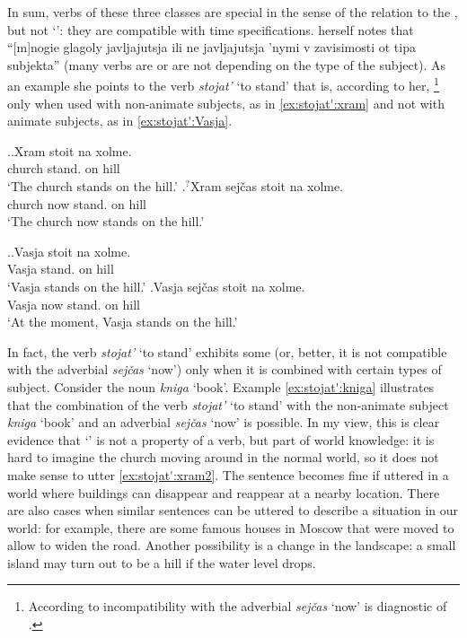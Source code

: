 In sum, verbs of these three classes are special in the sense of the relation to the , but not `': they are compatible with time specifications. \citet[132]{Paducheva:96} herself notes that ``[m]nogie glagoly javljajutsja ili ne javljajutsja 'nymi v zavisimosti ot tipa subjekta'' (many verbs are or are not  depending on the type of the subject). As an example she points to the verb \textit{stojat'} `to stand' that is, according to her, \footnote{According to \citet{Paducheva:96} incompatibility with the adverbial \textit{sej\v{c}as} `now' is diagnostic of .} only when used with non-animate subjects, as in \ref{ex:stojat':xram} and not with animate subjects, as in \ref{ex:stojat':Vasja}.

\ex.\label{ex:stojat':xram}\ag.Xram stoit na xolme.\\
church stand. on hill\\
\trans `The church stands on the hill.'
\bg.\label{ex:stojat':xram2}$^?$Xram sej\v{c}as stoit na xolme.\\
church now stand. on hill\\
\trans `The church now stands on the hill.'

\ex.\label{ex:stojat':Vasja}\ag.Vasja stoit na xolme.\\
Vasja stand. on hill\\
\trans `Vasja stands on the hill.'
\bg.Vasja sej\v{c}as stoit na xolme.\\
Vasja now stand. on hill\\
\trans `At the moment, Vasja stands on the hill.'

In fact, the verb \textit{stojat'} `to stand' exhibits some  (or, better, it is not compatible with the adverbial \textit{sej\v{c}as} `now') only when it is combined with certain types of subject. Consider the noun \textit{kniga} `book'. Example \ref{ex:stojat':kniga} illustrates that the combination of the verb \textit{stojat'} `to stand' with the non-animate subject \textit{kniga} `book' and an adverbial \textit{sej\v{c}as} `now' is possible.  In my view, this is clear evidence that `' is not a property of a verb, but part of world knowledge: it is hard to imagine the church moving around in the normal world, so it does not make sense to utter \ref{ex:stojat':xram2}. The sentence becomes fine if uttered in a world where buildings can disappear and reappear at a nearby location. There are also cases when similar sentences can be uttered to describe a situation in our world: for example, there are some famous houses in Moscow that were moved to allow to widen the road. Another possibility is a change in the landscape: a small island may turn out to be a hill if the water level drops. 

